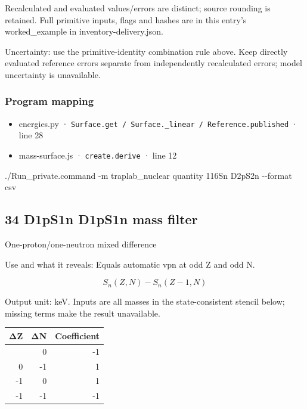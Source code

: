 \documentclass[
  11pt,
  letterpaper,
]{article}
\newenvironment{Shaded}{}{}
\newcommand{\AttributeTok}[1]{\textcolor[rgb]{0.49,0.56,0.16}{#1}}
\newcommand{\ExtensionTok}[1]{#1}
\newcommand{\NormalTok}[1]{#1}
\providecommand{\tightlist}{%
  \setlength{\itemsep}{0pt}\setlength{\parskip}{0pt}}
\begin{document}
Recalculated and evaluated values/errors are distinct; source rounding
is retained. Full primitive inputs, flags and hashes are in this entry's
worked\_example in inventory-delivery.json.

Uncertainty: use the primitive-identity combination rule above. Keep
directly evaluated reference errors separate from independently
recalculated errors; model uncertainty is unavailable.

\subsubsection{Program mapping}\label{program-mapping-32}

\begin{itemize}
\tightlist
\item
  energies.py ·
  \texttt{Surface.get\ /\ Surface.\_linear\ /\ Reference.published} ·
  line 28
\item
  mass-surface.js · \texttt{create.derive} · line 12
\end{itemize}

\begin{Shaded}
\begin{Highlighting}[]
\ExtensionTok{./Run\_private.command} \AttributeTok{{-}m}\NormalTok{ traplab\_nuclear quantity 116Sn D2pS2n }\AttributeTok{{-}{-}format}\NormalTok{ csv}
\end{Highlighting}
\end{Shaded}

\subsection{34 D1pS1n D1pS1n mass
filter}\label{d1ps1n-d1ps1n-mass-filter}

One-proton/one-neutron mixed difference

Use and what it reveals: Equals automatic vpn at odd Z and odd N.

\[
S_n(Z,N)-S_n(Z-1,N)
\]

Output unit: keV. Inputs are all masses in the state-consistent stencil
below; missing terms make the result unavailable.

\begin{longtable}[]{@{}rrr@{}}
\toprule\noalign{}
ΔZ & ΔN & Coefficient \\
\midrule\noalign{}
\endhead
\bottomrule\noalign{}
\endlastfoot
0 & 0 & -1 \\
0 & -1 & 1 \\
-1 & 0 & 1 \\
-1 & -1 & -1 \\
\end{longtable}
\end{document}
